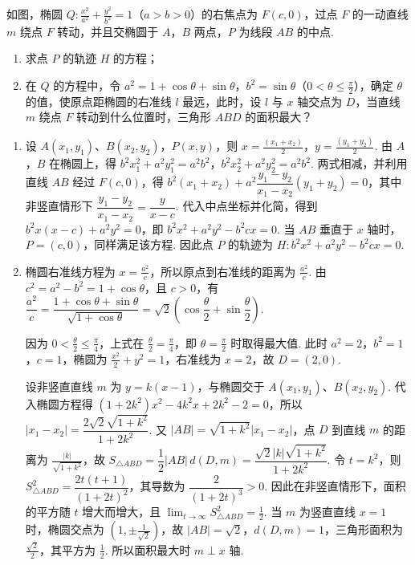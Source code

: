 \begin{problem}
如图，椭圆 \(Q: \frac{x^2}{a^2} + \frac{y^2}{b^2} = 1\)（\(a > b > 0\)）的右焦点为 \(F(c, 0)\)，过点 \(F\) 的一动直线 \(m\) 绕点 \(F\) 转动，并且交椭圆于 \(A\)，\(B\) 两点，\(P\) 为线段 \(AB\) 的中点.

\begin{enumerate}
\item 求点 \(P\) 的轨迹 \(H\) 的方程；
\item 在 \(Q\) 的方程中，令 \(a^2 = 1 + \cos \theta + \sin \theta\)，\(b^2 = \sin \theta\)（\(0 < \theta \leqslant \frac{\pi}{2}\)），确定 \(\theta\) 的值，使原点距椭圆的右准线 \(l\) 最远，此时，设 \(l\) 与 \(x\) 轴交点为 \(D\)，当直线 \(m\) 绕点 \(F\) 转动到什么位置时，三角形 \(ABD\) 的面积最大？
\end{enumerate}

\end{problem}

\begin{solution}
\begin{enumerate}
\item 设 \(A(x_1,y_1)\)、\(B(x_2,y_2)\)，\(P(x,y)\)，则 \(x=\frac{(x_1+x_2)}{2}\)，\(y=\frac{(y_1+y_2)}{2}\). 由 \(A\)，\(B\) 在椭圆上，得
\(b^2x_1^2+a^2y_1^2=a^2b^2\)，\(b^2x_2^2+a^2y_2^2=a^2b^2\). 两式相减，并利用直线 \(AB\) 经过 \(F(c,0)\)，得
\(b^2(x_1+x_2)+a^2\dfrac{y_1-y_2}{x_1-x_2}(y_1+y_2)=0\)，其中非竖直情形下 \(\dfrac{y_1-y_2}{x_1-x_2}=\dfrac{y}{x-c}\). 代入中点坐标并化简，得到
\(b^2x(x-c)+a^2y^2=0\)，即 \(b^2x^2+a^2y^2-b^2cx=0\). 当 \(AB\) 垂直于 \(x\) 轴时，\(P=(c,0)\)，同样满足该方程. 因此点 \(P\) 的轨迹为
\(H:b^2x^2+a^2y^2-b^2cx=0\).
\item 椭圆右准线方程为 \(x=\frac{a^2}{c}\)，所以原点到右准线的距离为 \(\frac{a^2}{c}\). 由 \(c^2=a^2-b^2=1+\cos\theta\)，且 \(c>0\)，有
\(\dfrac{a^2}{c}=\dfrac{1+\cos\theta+\sin\theta}{\sqrt{1+\cos\theta}}=\sqrt2\left(\cos\dfrac\theta2+\sin\dfrac\theta2\right)\).

因为 \(0<\frac{\theta}{2}\leqslant\frac{\pi}{4}\)，上式在 \(\frac{\theta}{2}=\frac{\pi}{4}\)，即 \(\theta=\frac{\pi}{2}\) 时取得最大值. 此时 \(a^2=2\)，\(b^2=1\)，\(c=1\)，椭圆为 \(\frac{x^2}{2}+y^2=1\)，右准线为 \(x=2\)，故 \(D=(2,0)\).

设非竖直直线 \(m\) 为 \(y=k(x-1)\)，与椭圆交于 \(A(x_1,y_1)\)、\(B(x_2,y_2)\). 代入椭圆方程得 \((1+2k^2)x^2-4k^2x+2k^2-2=0\)，所以
\(|x_1-x_2|=\dfrac{2\sqrt{2}\sqrt{1+k^2}}{1+2k^2}\). 又 \(|AB|=\sqrt{1+k^2}|x_1-x_2|\)，点 \(D\) 到直线 \(m\) 的距离为 \(\frac{|k|}{\sqrt{1+k^2}}\)，故
\(S_{\triangle ABD}=\dfrac12|AB|\,d(D,m)=\dfrac{\sqrt2|k|\sqrt{1+k^2}}{1+2k^2}\). 令 \(t=k^2\)，则
\(S_{\triangle ABD}^{2}=\dfrac{2t(t+1)}{(1+2t)^2}\)，其导数为 \(\dfrac{2}{(1+2t)^3}>0\). 因此在非竖直情形下，面积的平方随 \(t\) 增大而增大，且 \(\displaystyle\lim_{t\to\infty}S_{\triangle ABD}^{2}=\frac12\). 当 \(m\) 为竖直直线 \(x=1\) 时，椭圆交点为 \((1,\pm\frac{1}{\sqrt2})\)，故 \(|AB|=\sqrt2\)，\(d(D,m)=1\)，三角形面积为 \(\frac{\sqrt2}{2}\)，其平方为 \(\frac{1}{2}\). 所以面积最大时 \(m\perp x\) 轴.
\end{enumerate}
\end{solution}

